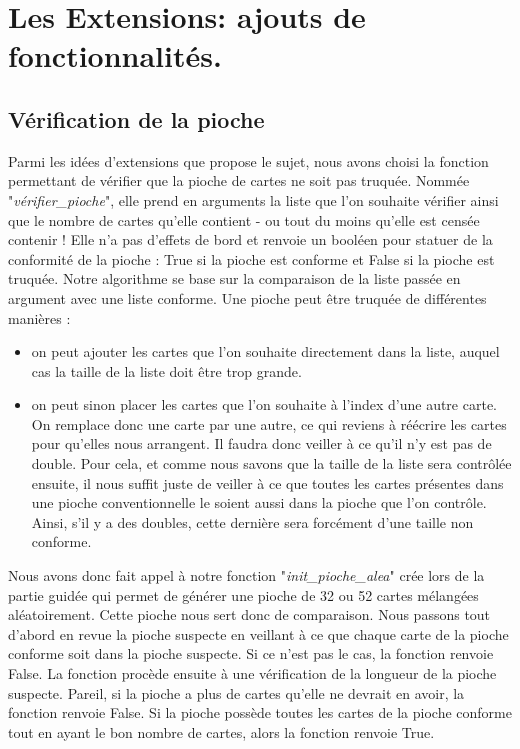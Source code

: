 \documentclass[10pt,a4paper,french,titlepage]{article}
\theoremstyle{definition}
\begin{document}
\section{Les Extensions: ajouts de fonctionnalités.}
\subsection{Vérification de la pioche}
Parmi les idées d'extensions que propose le sujet, nous avons choisi la fonction permettant de vérifier que la pioche de cartes ne soit pas truquée. Nommée "\textit{vérifier\_pioche}", elle prend en arguments la liste que l'on souhaite vérifier ainsi que le nombre de cartes qu'elle contient - ou tout du moins qu'elle est censée contenir ! Elle n'a pas d'effets de bord et renvoie un booléen pour statuer de la conformité de la pioche : True si la pioche est conforme et False si la pioche est truquée. Notre algorithme se base sur la comparaison de la liste passée en argument avec une liste conforme. Une pioche peut être truquée de différentes manières :
\begin{itemize}
\item on peut ajouter les cartes que l'on souhaite directement dans la liste, auquel cas la taille de la liste doit être trop grande.
\item on peut sinon placer les cartes que l'on souhaite à l'index d'une autre carte. On remplace donc une carte par une autre, ce qui reviens à réécrire les cartes pour qu'elles nous arrangent. Il faudra donc veiller à ce qu'il n'y est pas de double. Pour cela, et comme nous savons que la taille de la liste sera contrôlée ensuite, il nous suffit juste de veiller à ce que toutes les cartes présentes dans une pioche conventionnelle le soient aussi dans la pioche que l'on contrôle. Ainsi, s'il y a des doubles, cette dernière sera forcément d'une taille non conforme.\\
\end{itemize}

Nous avons donc fait appel à notre fonction "\textit{init\_pioche\_alea}" crée lors de la partie guidée qui permet de générer une pioche de 32 ou 52 cartes mélangées aléatoirement\label{piochealea}. Cette pioche nous sert donc de comparaison. Nous passons tout d'abord en revue la pioche suspecte en veillant à ce que chaque carte de la pioche conforme soit dans la pioche suspecte. Si ce n'est pas le cas, la fonction renvoie False. La fonction procède ensuite à une vérification de la longueur de la pioche suspecte. Pareil, si la pioche a plus de cartes qu'elle ne devrait en avoir, la fonction renvoie False. Si la pioche possède toutes les cartes de la pioche conforme tout en ayant le bon nombre de cartes, alors la fonction renvoie True.
\end{document}
